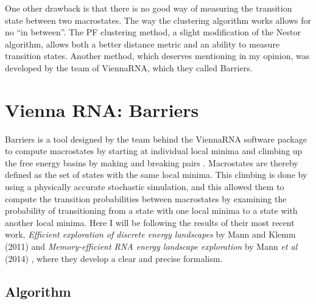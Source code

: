 One other drawback is that there is no good way of measuring the
transition state between two macrostates. The way the clustering
algorithm works allows for no ``in between''. The PF clustering
method, a slight modification of the Nestor algorithm, allows both a
better distance metric and an ability to measure transition
states. Another method, which deserves mentioning in my opinion, was
developed by the team of ViennaRNA, which they called Barriers.

\section{Vienna RNA: Barriers}

Barriers is a tool designed by the team behind the ViennaRNA software
package to compute macrostates by starting at individual local minima
and climbing up the free energy basins by making and breaking pairs
\cite{flamm2002barrier} \cite{wolfinger2004efficient}. Macrostates are
thereby defined as the set of states with the same local minima. This
climbing is done by using a physically accurate stochastic simulation,
and this allowed them to compute the transition probabilities between
macrostates by examining the probability of transitioning from a state
with one local minima to a state with another local minima. Here I
will be following the results of their most recent work,
\emph{Efficient exploration of discrete energy landscapes} by Mann and
Klemm (2011) and \emph{Memory-efficient RNA energy landscape
  exploration} by Mann \emph{et al} (2014) \cite{PhysRevE.83.011113}
\cite{mann2014memory}, where they develop a clear and precise
formalism.

\subsection{Algorithm}


